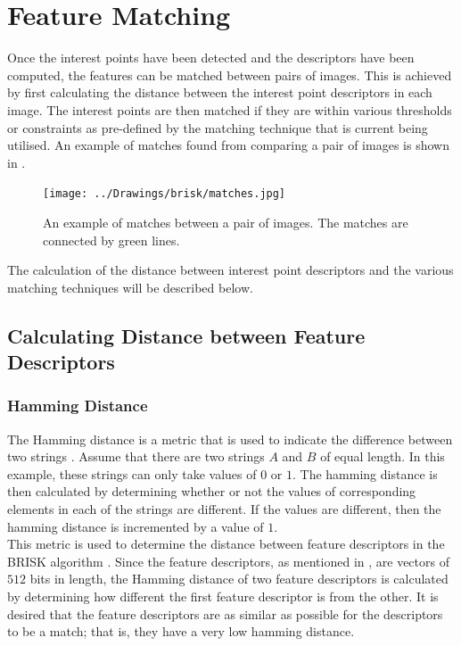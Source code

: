 \documentclass{report}
\begin{document}
\chapter{Feature Matching}
\label{sec:matching}
Once the interest points have been detected and the descriptors have been computed, the features can be matched between pairs of images. This is achieved by first calculating the distance between the interest point descriptors in each image. The interest points are then matched if they are within various thresholds or constraints as pre-defined by the matching technique that is current being utilised. An example of matches found from comparing a pair of images is shown in .

\begin{figure}[h!] 
  \centering
    \texttt{[image: ../Drawings/brisk/matches.jpg]}
    \caption{An example of matches between a pair of images. The matches are connected by green lines.}
    \label{fig:matchesIntro}
\end{figure}

The calculation of the distance between interest point descriptors and the various matching techniques will be described below. \\

\section{Calculating Distance between Feature Descriptors}
\label{sec:distance}

\subsection{Hamming Distance}
\label{sec:hamming}
The Hamming distance is a metric that is used to indicate the difference between two strings \cite{Banzal2007}. Assume that there are two strings $A$ and $B$ of equal length. In this example, these strings can only take values of $0$ or $1$. The hamming distance is then calculated by determining whether or not the values of corresponding elements in each of the strings are different. If the values are different, then the hamming distance is incremented by a value of $1$.\\

This metric is used to determine the distance between feature descriptors in the BRISK algorithm \cite{Leutenegger2011}. Since the feature descriptors, as mentioned in , are vectors of $512$ bits in length, the Hamming distance of two feature descriptors is calculated by determining how different the first feature descriptor is from the other. It is desired that the feature descriptors are as similar as possible for the descriptors to be a match; that is, they have a very low hamming distance. \\
\end{document}
